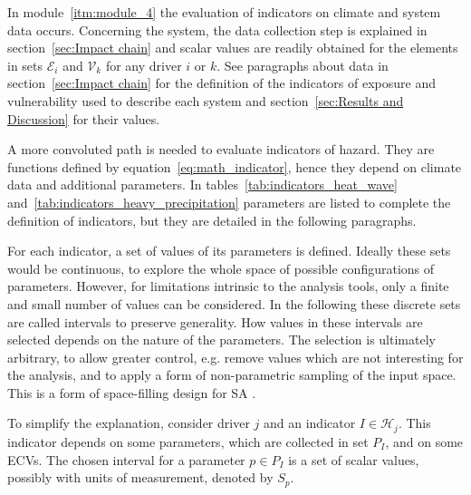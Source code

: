 In module~\ref{itm:module_4} the evaluation of \glspl{indicator} on climate and system data occurs. Concerning the system, the data collection step is explained in section~\ref{sec:Impact chain} and scalar values are readily obtained for the elements in sets $\mathcal{E}_i$ and $\mathcal{V}_k$ for any \gls{driver} $i$ or $k$. See paragraphs about data in section~\ref{sec:Impact chain} for the definition of the \glspl{indicator} of \gls{exposure} and \gls{vulnerability} used to describe each system and section~\ref{sec:Results and Discussion} for their values.

A more convoluted path is needed to evaluate \glspl{indicator} of \gls{hazard}. They are functions defined by equation~\eqref{eq:math_indicator}, hence they depend on climate data and additional parameters. In tables~\ref{tab:indicators_heat_wave} and~\ref{tab:indicators_heavy_precipitation} parameters are listed to complete the definition of indicators, but they are detailed in the following paragraphs.

For each \gls{indicator}, a set of values of its parameters is defined. Ideally these sets would be continuous, to explore the whole space of possible configurations of parameters. However, for limitations intrinsic to the analysis tools, only a finite and small number of values can be considered. In the following these discrete sets are called intervals to preserve generality.
How values in these intervals are selected depends on the nature of the parameters. The selection is ultimately arbitrary, to allow greater control, e.g. remove values which are not interesting for the analysis, and to apply a form of non-parametric sampling of the input space. This is a form of space-filling design for \gls{SA} \cite[593-594]{2015DeanHandbookOf}.

To simplify the explanation, consider \gls{driver} $j$ and an \gls{indicator} $I \in \mathcal{H}_j$. This \gls{indicator} depends on some parameters, which are collected in set $P_I$, and on some \glspl{ECV}. The chosen interval for a parameter $p \in P_I$ is a set of scalar values, possibly with units of measurement, denoted by $S_p$.

